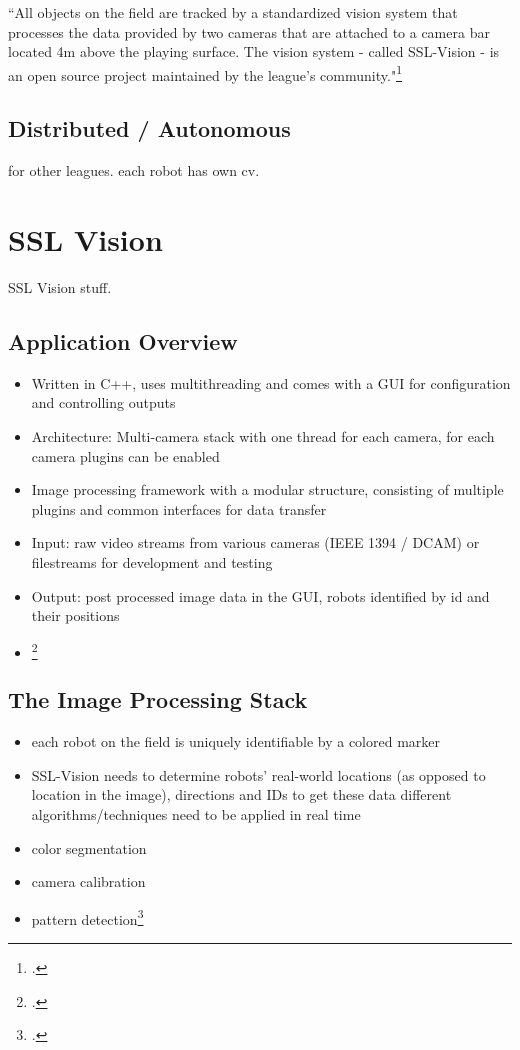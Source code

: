 ``All objects on the field are tracked by a standardized vision system that
processes the data provided by two cameras that are attached to a camera bar
located 4m above the playing surface. The vision system - called SSL-Vision - is
an open source project maintained by the league's community."\footcite[Cf.][]{robo_ssl}


\subsection{Distributed / Autonomous}
for other leagues. each robot has own cv.




\newpage
\section{SSL Vision \label{sec:ssl-vision}}
SSL Vision stuff.

\subsection{Application Overview \label{sec:ssl-overview}}



\begin{itemize}
  \item Written in C++, uses multithreading and comes with a GUI for
  configuration and controlling outputs
  \item Architecture: Multi-camera stack with one thread for each camera, for each camera plugins can be enabled
  \item Image processing framework with a modular structure, consisting of multiple plugins and common interfaces for data transfer
  \item Input: raw video streams from various cameras (IEEE 1394 / DCAM) or filestreams for development and testing
  \item Output: post processed image data in the GUI, robots identified by id and their positions
  \item \footcite[Cf.][]{zickler_ssl_vision}
\end{itemize}

\subsection{The Image Processing Stack}

\begin{itemize}
  \item each robot on the field is uniquely identifiable by a colored marker
  \item SSL-Vision needs to determine robots’ real-world locations (as opposed
        to location in the image), directions and IDs to get these data
        different algorithms/techniques need to be applied in real time
  \item color segmentation
  \item camera calibration
  \item pattern detection\footcite[Cf.][]{zickler_ssl_vision}
\end{itemize}

